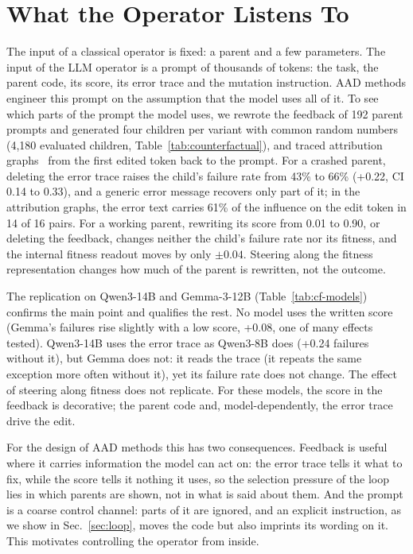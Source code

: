 \section{What the Operator Listens To}\label{sec:listening}

The input of a classical operator is fixed: a parent and a few
parameters. The input of the LLM operator is a prompt of thousands of
tokens: the task, the parent code, its score, its error trace and the
mutation instruction. AAD methods engineer this prompt on the
assumption that the model uses all of it.
To see which parts of the prompt the model uses, we rewrote the
feedback of 192 parent prompts and generated four children per variant
with common random numbers (4,180 evaluated children,
Table~\ref{tab:counterfactual}), and traced attribution
graphs~\cite{ameisen2025circuits} from the first edited token back to
the prompt. For a crashed parent, deleting the error trace raises the
child's failure rate from 43\% to 66\% (+0.22, CI 0.14 to 0.33), and a
generic error message recovers only part of it; in the attribution
graphs, the error text carries 61\% of the influence on the edit token
in 14 of 16 pairs. For a working parent, rewriting its score from 0.01
to 0.90, or deleting the feedback, changes neither the child's failure
rate nor its fitness, and the internal fitness readout moves by only
$\pm0.04$. Steering along the fitness representation changes how much
of the parent is rewritten, not the outcome.

The replication on Qwen3-14B and Gemma-3-12B
(Table~\ref{tab:cf-models}) confirms the main point and
qualifies the rest. No model uses the written score (Gemma's failures
rise slightly with a low score, +0.08, one of many effects tested).
Qwen3-14B uses the error trace as Qwen3-8B does (+0.24 failures
without it), but Gemma does not: it reads the trace (it repeats the
same exception more often without it), yet its failure rate does not
change. The effect of steering along fitness does not replicate. For
these models, the score in the feedback is decorative; the parent code
and, model-dependently, the error trace drive the edit.

For the design of AAD methods this has two consequences. Feedback is
useful where it carries information the model can act on: the error
trace tells it what to fix, while the score tells it nothing it uses,
so the selection pressure of the loop lies in which parents are shown,
not in what is said about them. And the prompt is a coarse control
channel: parts of it are ignored, and an explicit instruction, as we
show in Sec.~\ref{sec:loop}, moves the code but also imprints its
wording on it. This motivates controlling the operator from inside.
